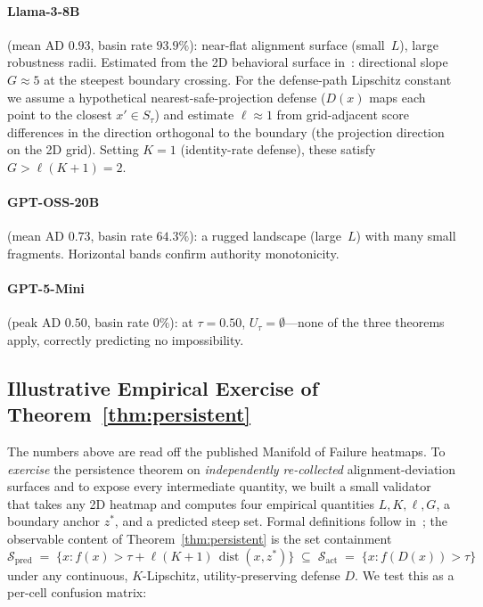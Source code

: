 \documentclass{article}
\newcommand{\dist}{\operatorname{dist}}
\begin{document}
\paragraph{Llama-3-8B} (mean AD $0.93$, basin rate $93.9\%$):
near-flat alignment surface (small~$L$), large robustness radii.
Estimated from the 2D behavioral surface in~\cite{munshi2026manifold}: directional slope $G \approx 5$ at the steepest boundary crossing.
For the defense-path Lipschitz constant we assume a hypothetical
nearest-safe-projection defense ($D(x)$ maps each point to the closest
$x' \in S_\tau$) and estimate $\ell \approx 1$ from grid-adjacent
score differences in the direction orthogonal to the boundary
(the projection direction on the 2D grid). Setting $K = 1$
(identity-rate defense), these satisfy $G > \ell(K+1) = 2$.

\paragraph{GPT-OSS-20B} (mean AD $0.73$, basin rate $64.3\%$): a
rugged landscape (large~$L$) with many small fragments. Horizontal
bands confirm authority monotonicity.

\paragraph{GPT-5-Mini} (peak AD $0.50$, basin rate $0\%$): at
$\tau = 0.50$, $U_\tau = \emptyset$---none of the three theorems
apply, correctly predicting no impossibility.


\subsection{Illustrative Empirical Exercise of Theorem~\ref{thm:persistent}}
\label{sec:live-validation}

The numbers above are read off the published Manifold of Failure
heatmaps. To \emph{exercise} the persistence theorem on
\emph{independently re-collected} alignment-deviation surfaces and
to expose every intermediate quantity, we built a small validator
that takes any 2D heatmap and computes four empirical quantities
$L, K, \ell, G$, a boundary anchor $z^{*}$, and a predicted steep
set. Formal definitions follow in~; the
observable content of Theorem~\ref{thm:persistent} is the set
containment
\[
\mathcal{S}_{\text{pred}} \;=\;
\bigl\{x : f(x) > \tau + \ell(K{+}1)\,\dist(x, z^{*})\bigr\}
\;\subseteq\;
\mathcal{S}_{\text{act}} \;=\; \bigl\{x : f(D(x)) > \tau\bigr\}
\]
under any continuous, $K$-Lipschitz, utility-preserving defense
$D$. We test this as a per-cell confusion matrix:
\end{document}
